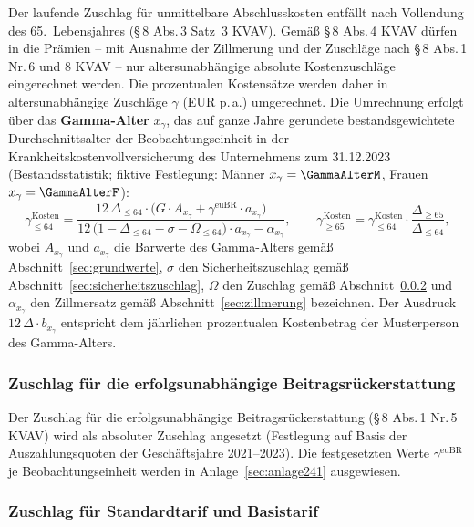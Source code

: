 Der laufende Zuschlag für unmittelbare Abschlusskosten entfällt nach
Vollendung des 65.~Lebensjahres (\S\,8 Abs.\,3 Satz~3 KVAV).
Gemäß \S\,8 Abs.\,4 KVAV dürfen in die Prämien -- mit Ausnahme der
Zillmerung und der Zuschläge nach \S\,8 Abs.\,1 Nr.\,6 und 8 KVAV --
nur altersunabhängige absolute Kostenzuschläge eingerechnet werden.
Die prozentualen Kostensätze werden daher in altersunabhängige
Zuschläge $\gamma$ (EUR p.\,a.) umgerechnet. Die Umrechnung erfolgt
über das \textbf{Gamma-Alter} $x_\gamma$, das auf ganze Jahre
gerundete bestandsgewichtete Durchschnittsalter der
Beobachtungseinheit in der Krankheitskostenvollversicherung des
Unternehmens zum 31.12.2023 (Bestandsstatistik; fiktive Festlegung:
Männer $x_\gamma = \GammaAlterM$, Frauen $x_\gamma = \GammaAlterF$):
\begin{equation}
\gamma^{\mathrm{Kosten}}_{\le 64}
= \frac{12\,\Delta_{\le 64}\cdot\bigl(G\cdot A_{x_\gamma}
  + \gamma^{\mathrm{euBR}}\cdot a_{x_\gamma}\bigr)}
       {12\,\bigl(1-\Delta_{\le 64}-\sigma-\Omega_{\le 64}\bigr)\cdot
        a_{x_\gamma} - \alpha_{x_\gamma}},
\qquad
\gamma^{\mathrm{Kosten}}_{\ge 65}
= \gamma^{\mathrm{Kosten}}_{\le 64}\cdot
  \frac{\Delta_{\ge 65}}{\Delta_{\le 64}},
\label{eq:gammakosten}
\end{equation}
wobei $A_{x_\gamma}$ und $a_{x_\gamma}$ die Barwerte des Gamma-Alters
gemäß Abschnitt~\ref{sec:grundwerte}, $\sigma$ den Sicherheitszuschlag
gemäß Abschnitt~\ref{sec:sicherheitszuschlag},
$\Omega$ den Zuschlag gemäß Abschnitt~\ref{sec:omega} und
$\alpha_{x_\gamma}$ den Zillmersatz gemäß
Abschnitt~\ref{sec:zillmerung} bezeichnen. Der Ausdruck
$12\,\Delta\cdot b_{x_\gamma}$ entspricht dem jährlichen prozentualen
Kostenbetrag der Musterperson des Gamma-Alters.

\subsubsection{Zuschlag für die erfolgsunabhängige
Beitragsrückerstattung}\label{sec:eubr}

Der Zuschlag für die erfolgsunabhängige Beitragsrückerstattung
(\S\,8 Abs.\,1 Nr.\,5 KVAV) wird als absoluter Zuschlag angesetzt
(Festlegung auf Basis der Auszahlungsquoten der Geschäftsjahre
2021--2023). Die festgesetzten Werte $\gamma^{\mathrm{euBR}}$ je
Beobachtungseinheit werden in Anlage~\ref{sec:anlage241}
ausgewiesen.

\subsubsection{Zuschlag für Standardtarif und Basistarif}
\label{sec:omega}

